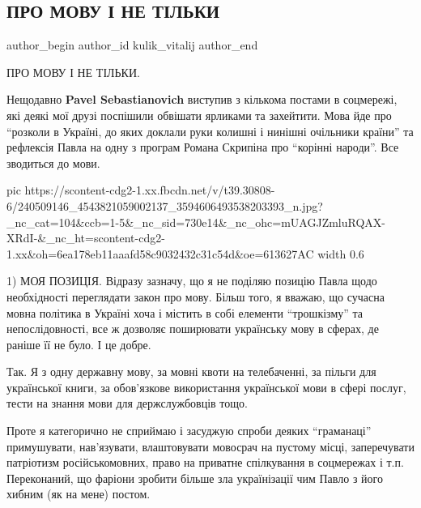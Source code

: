  
 
 
 
 
 
\subsection{ПРО МОВУ І НЕ ТІЛЬКИ}
\label{sec:31_08_2021.fb.kulik_vitalij.1.pro_movu_i_ne_tilky}
 
\ifcmt
 author_begin
   author_id kulik_vitalij
 author_end
\fi

ПРО МОВУ І НЕ ТІЛЬКИ.

Нещодавно \textbf{Pavel Sebastianovich} виступив з кількома постами в соцмережі, які
деякі мої друзі поспішили обвішати ярликами та захейтити. Мова йде про
\enquote{розколи в Україні, до яких доклали руки колишні і нинішні очільники
країни} та рефлексія Павла на одну з програм Романа Скрипіна про
\enquote{корінні народи}. Все зводиться до мови. 

\ifcmt
  pic https://scontent-cdg2-1.xx.fbcdn.net/v/t39.30808-6/240509146_4543821059002137_3594606493538203393_n.jpg?_nc_cat=104&ccb=1-5&_nc_sid=730e14&_nc_ohc=mUAGJZmluRQAX-XRdI-&_nc_ht=scontent-cdg2-1.xx&oh=6ea178eb11aaafd58c9032432c31c54d&oe=613627AC
  width 0.6
\fi

1) МОЯ ПОЗИЦІЯ. Відразу зазначу, що я не поділяю позицію Павла щодо
необхідності переглядати закон про мову. Більш того, я вважаю, що сучасна мовна
політика в Україні хоча і містить в собі елементи \enquote{трошкізму} та
непослідовності, все ж дозволяє поширювати українську мову в сферах, де раніше
її не було. І це добре.

Так. Я з одну державну мову, за мовні квоти на телебаченні, за пільги для
української книги, за обов’язкове використання української мови в сфері послуг,
тести на знання мови для держслужбовців тощо. 

Проте я категорично не сприймаю і засуджую спроби деяких \enquote{граманаці}
примушувати, нав’язувати, влаштовувати мовосрач на пустому місці, заперечувати
патріотизм російськомовних, право на приватне спілкування в соцмережах і т.п.
Переконаний, що фаріони зробити більше зла українізації чим Павло з його хибним
(як на мене) постом.

